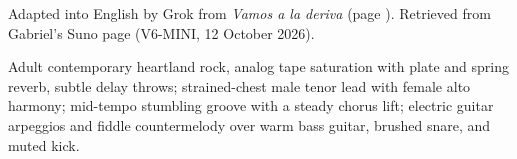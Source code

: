 
\begin{notes}
Adapted into English by Grok from \emph{Vamos a la deriva} (page \pageref{sec:vamos-a-la-deriva}). Retrieved from Gabriel's Suno page (V6-MINI, 12 October 2026).
\end{notes}
\begin{style}
Adult contemporary heartland rock, analog tape saturation with plate and spring reverb, subtle delay throws; strained-chest male tenor lead with female alto harmony; mid-tempo stumbling groove with a steady chorus lift; electric guitar arpeggios and fiddle countermelody over warm bass guitar, brushed snare, and muted kick.
\end{style}
